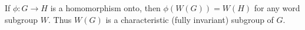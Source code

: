 If $\phi: G \to H$ is a homomorphism onto, then $\phi(W(G)) = W(H)$ for any word subgroup $W$. Thus $W(G)$ is a characteristic (fully invariant) subgroup of $G$.
